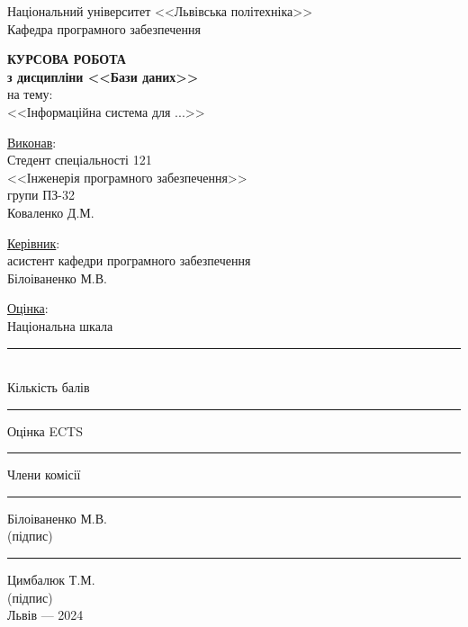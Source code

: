 \documentclass[oneside,14pt]{extarticle}
\begin{document}
\begin{titlepage}
	\begin{center}
		Національний університет <<Львівська політехніка>>\\
		Кафедра програмного забезпечення
		
		\vspace{40pt}
		\textbf{\LARGE КУРСОВА РОБОТА}\\
		{\large
		\textbf{з дисципліни <<Бази даних>>}\\
		на тему:\\
		<<Інформаційна система для ...>>
		}
		\vspace*{40pt}
		
		\begin{flushright}
		    \begin{minipage}{0.6\textwidth}
		        \underline{Виконав}:\\
                Стедент спеціальності 121\\
			    <<Інженерія програмного забезпечення>>\\
			    групи ПЗ-32\\
			    Коваленко Д.М.
			    \bigbreak
			    
			    \underline{Керівник}:\\
			    асистент кафедри програмного забезпечення\\
			    Білоіваненко М.В.
			    \bigbreak
			    
			    \underline{Оцінка}:\\
			    Національна шкала \rule{6.35cm}{0.15mm}\\			
			    Кількість балів \rule{2cm}{0.15mm} Оцінка ECTS \rule{2cm}{0.15mm}
			    \bigbreak
            \end{minipage}
		\end{flushright}
		\vspace{40pt}
		Члени комісії \hspace{1.9cm} \rule{3cm}{0.15mm} \hspace{1cm} Білоіваненко М.В.\\
		{\small\vspace{-5pt}(підпис)}\\
		\hspace{2.65cm}\hspace{1.9cm}  \rule{3cm}{0.15mm} \hspace{1cm} Цимбалюк Т.М.\\
		{\small\vspace{-5pt}(підпис)}\\
		
		\vspace{\fill}
		Львів — 2024
	\end{center}
\end{titlepage}
\setcounter{page}{2}
\tableofcontents
\newpage
\end{document}
